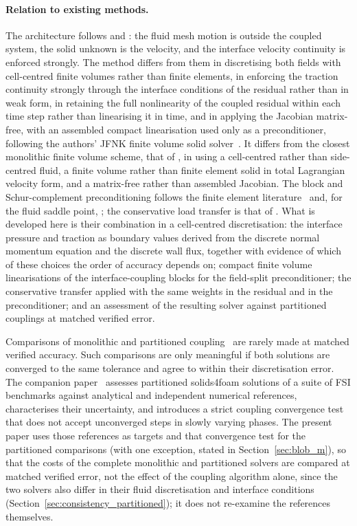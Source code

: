 \paragraph{Relation to existing methods.}
The architecture follows \citet{Liu2014} and \citet{JaimanJoshi2022}: the fluid mesh motion is outside the coupled system, the solid unknown is the velocity, and the interface velocity continuity is enforced strongly.
The method differs from them in discretising both fields with cell-centred finite volumes rather than finite elements, in enforcing the traction continuity strongly through the interface conditions of the residual rather than in weak form, in retaining the full nonlinearity of the coupled residual within each time step rather than linearising it in time, and in applying the Jacobian matrix-free, with an assembled compact linearisation used only as a preconditioner, following the authors' JFNK finite volume solid solver~\citep{Cardiff2026}.
It differs from the closest monolithic finite volume scheme, that of \citet{Eken2016}, in using a cell-centred rather than side-centred fluid, a finite volume rather than finite element solid in total Lagrangian velocity form, and a matrix-free rather than assembled Jacobian.
The block and Schur-complement preconditioning follows the finite element literature~\citep{Heil2004, Deparis2016} and, for the fluid saddle point, \citet{Eken2016}; the conservative load transfer is that of \citet{Farhat1998}.
What is developed here is their combination in a cell-centred discretisation: the interface pressure and traction as boundary values derived from the discrete normal momentum equation and the discrete wall flux, together with evidence of which of these choices the order of accuracy depends on; compact finite volume linearisations of the interface-coupling blocks for the field-split preconditioner; the conservative transfer applied with the same weights in the residual and in the preconditioner; and an assessment of the resulting solver against partitioned couplings at matched verified error.

Comparisons of monolithic and partitioned coupling~\citep{Heil2008, Degroote2009} are rarely made at matched verified accuracy.
Such comparisons are only meaningful if both solutions are converged to the same tolerance and agree to within their discretisation error.
The companion paper~\citep{CardiffFSIVerification2026} assesses partitioned solids4foam solutions of a suite of FSI benchmarks against analytical and independent numerical references, characterises their uncertainty, and introduces a strict coupling convergence test that does not accept unconverged steps in slowly varying phases.
The present paper uses those references as targets and that convergence test for the partitioned comparisons (with one exception, stated in Section~\ref{sec:blob_m}), so that the costs of the complete monolithic and partitioned solvers are compared at matched verified error, not the effect of the coupling algorithm alone, since the two solvers also differ in their fluid discretisation and interface conditions (Section~\ref{sec:consistency_partitioned}); it does not re-examine the references themselves.


